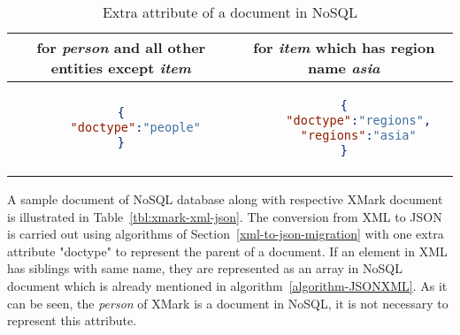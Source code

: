 \begin{longtable}{c|c}
	\caption{ Extra attribute of a document in NoSQL}
	\label{tbl:xmark-item-type}\\
    {for \textit{person} and all other entities except \textit{item} } & {for \textit{item} which has region name \textit{asia}}\\
	\hline
\begin{minipage}{.4\textwidth}
\begin{lstlisting}[language=JSON]
{
	"doctype":"people"
}
\end{lstlisting}
\end{minipage} &
\begin{minipage}{.4\textwidth}
\begin{lstlisting}[language=JSON]
{
	"doctype":"regions",
	"regions":"asia"
}
\end{lstlisting}
\end{minipage}
\end{longtable}

A sample document of NoSQL database along with respective XMark document is illustrated in  Table~\ref{tbl:xmark-xml-json}. The conversion from XML to JSON is carried out using algorithms of Section~\ref{xml-to-json-migration} with one extra attribute "doctype" to represent the parent of a document. If an element in XML has siblings with same name, they are represented as an array in NoSQL document which is already mentioned in algorithm~\ref{algorithm-JSONXML}. As it can be seen, the \textit{person} of XMark is a document in NoSQL, it is not necessary to represent this attribute.  

